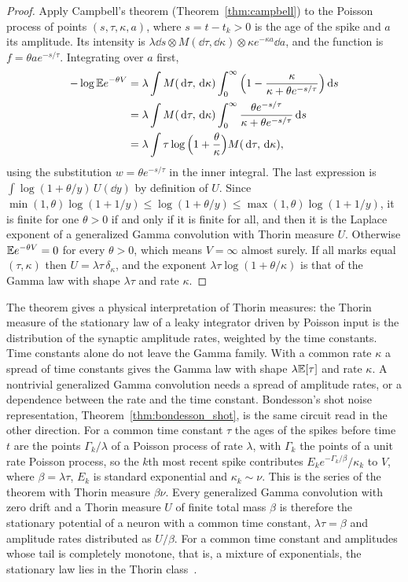\begin{proof}
Apply Campbell's theorem (Theorem~\ref{thm:campbell}) to the Poisson process of points $(s,\tau,\kappa,a)$, where $s = t-t_k>0$ is the age of the spike and $a$ its amplitude. Its intensity is $\lambda\dd s\otimes M(\dd\tau,\dd\kappa)\otimes\kappa e^{-\kappa a}\dd a$, and the function is $f = \theta ae^{-s/\tau}$. Integrating over $a$ first,
\[
\begin{aligned}-\log\mathbb{E} e^{-\theta V} &= \lambda\int M(\,\mathrm{d}\tau,\,\mathrm{d}\kappa)\int_0^\infty\Big(1-\frac{\kappa}{\kappa+\theta e^{-s/\tau}}\Big)\,\mathrm{d} s\\ &= \lambda\int M(\,\mathrm{d}\tau,\,\mathrm{d}\kappa)\int_0^\infty\frac{\theta e^{-s/\tau}}{\kappa+\theta e^{-s/\tau}}\,\mathrm{d} s\\ &= \lambda\int\tau\log\Big(1+\frac\theta\kappa\Big)M(\,\mathrm{d}\tau,\,\mathrm{d}\kappa),\end{aligned}
\]
using the substitution $w = \theta e^{-s/\tau}$ in the inner integral. The last expression is $\int\log(1+\theta/y)\,U(\dd y)$ by definition of $U$. Since $\min(1,\theta)\log(1+1/y)\leq\log(1+\theta/y)\leq\max(1,\theta)\log(1+1/y)$, it is finite for one $\theta>0$ if and only if it is finite for all, and then it is the Laplace exponent of a generalized Gamma convolution with Thorin measure $U$. Otherwise $\mathbb{E} e^{-\theta V} = 0$ for every $\theta>0$, which means $V = \infty$ almost surely. If all marks equal $(\tau,\kappa)$ then $U = \lambda\tau\,\delta_\kappa$, and the exponent $\lambda\tau\log(1+\theta/\kappa)$ is that of the Gamma law with shape $\lambda\tau$ and rate $\kappa$.
\end{proof}

The theorem gives a physical interpretation of Thorin measures: the Thorin measure of the stationary law of a leaky integrator driven by Poisson input is the distribution of the synaptic amplitude rates, weighted by the time constants. Time constants alone do not leave the Gamma family. With a common rate $\kappa$ a spread of time constants gives the Gamma law with shape $\lambda\mathbb{E}[\tau]$ and rate $\kappa$. A nontrivial generalized Gamma convolution needs a spread of amplitude rates, or a dependence between the rate and the time constant. Bondesson's shot noise representation, Theorem~\ref{thm:bondesson_shot}, is the same circuit read in the other direction. For a common time constant $\tau$ the ages of the spikes before time $t$ are the points $\Gamma_k/\lambda$ of a Poisson process of rate $\lambda$, with $\Gamma_k$ the points of a unit rate Poisson process, so the $k$th most recent spike contributes $E_ke^{-\Gamma_k/\beta}/\kappa_k$ to $V$, where $\beta = \lambda\tau$, $E_k$ is standard exponential and $\kappa_k\sim\nu$. This is the series of the theorem with Thorin measure $\beta\nu$. Every generalized Gamma convolution with zero drift and a Thorin measure $U$ of finite total mass $\beta$ is therefore the stationary potential of a neuron with a common time constant, $\lambda\tau = \beta$ and amplitude rates distributed as $U/\beta$. For a common time constant and amplitudes whose tail is completely monotone, that is, a mixture of exponentials, the stationary law lies in the Thorin class~\cite{polsonsokolov2026gbcshot}.

